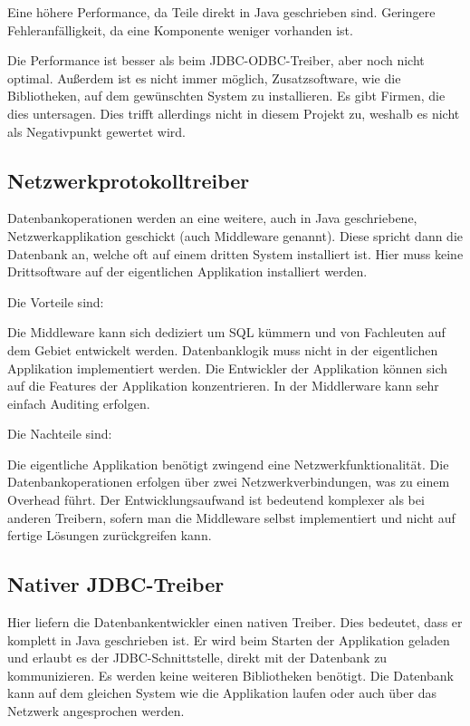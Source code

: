 {\begin{outline}
  \1 Eine höhere Performance, da Teile direkt in Java geschrieben sind.
  \1 Geringere Fehleranfälligkeit, da eine Komponente weniger vorhanden ist.
\end{outline}

Die Performance ist besser als beim JDBC\hyp{}ODBC\hyp{}Treiber, aber noch
nicht optimal.  Außerdem ist es nicht immer möglich, Zusatzsoftware, wie die
Bibliotheken, auf dem gewünschten System zu installieren. Es gibt Firmen, die
dies untersagen.  Dies trifft allerdings nicht in diesem Projekt zu, weshalb es
nicht als Negativpunkt gewertet wird.

\subsection{Netzwerkprotokolltreiber}
Datenbankoperationen werden an eine weitere, auch in Java geschriebene,
Netzwerkapplikation geschickt (auch \gls{Middleware} genannt). Diese spricht
dann die Datenbank an, welche oft auf einem dritten System installiert ist.
Hier muss keine Drittsoftware auf der eigentlichen Applikation installiert
werden.

Die Vorteile sind:

\begin{outline}
  \1 Die Middleware kann sich dediziert um SQL kümmern und von Fachleuten auf
  dem Gebiet entwickelt werden.
  \1 Datenbanklogik muss nicht in der eigentlichen Applikation implementiert
  werden. Die Entwickler der Applikation können sich auf die Features der
  Applikation konzentrieren.
  \1 In der Middlerware kann sehr einfach Auditing erfolgen.
\end{outline}

Die Nachteile sind:

\begin{outline}
  \1 Die eigentliche Applikation benötigt zwingend eine Netzwerkfunktionalität.
  \1 Die Datenbankoperationen erfolgen über zwei Netzwerkverbindungen, was
  zu einem Overhead führt.
  \1 Der Entwicklungsaufwand ist bedeutend komplexer als bei anderen Treibern,
  sofern man die Middleware selbst implementiert und nicht auf fertige Lösungen
  zurückgreifen kann.
\end{outline}

\subsection{Nativer JDBC-Treiber}
Hier liefern die Datenbankentwickler einen nativen Treiber. Dies bedeutet, dass
er komplett in Java geschrieben ist. Er wird beim Starten der Applikation
geladen und erlaubt es der JDBC\hyp{}Schnittstelle, direkt mit der Datenbank zu
kommunizieren. Es werden keine weiteren Bibliotheken benötigt. Die Datenbank
kann auf dem gleichen System wie die Applikation laufen oder auch über das
Netzwerk angesprochen werden.

}

